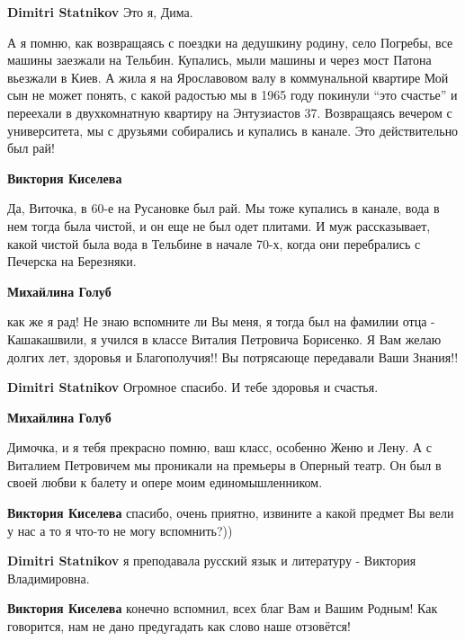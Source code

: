 \begin{itemize}
\begin{itemize}
\textbf{Dimitri Statnikov} Это я, Дима.


А я помню, как возвращаясь с поездки на дедушкину родину, село Погребы, все
машины заезжали на Тельбин. Купались, мыли машины и через мост Патона вьезжали
в Киев. А жила я на Ярославовом валу в коммунальной квартире Мой сын не может
понять, с какой радостью мы в 1965 году покинули \enquote{это счастье} и переехали в
двухкомнатную квартиру на Энтузиастов 37. Возвращаясь вечером с университета,
мы с друзьями собирались и купались в канале. Это действительно был рай!

\begin{itemize} %
\textbf{Виктория Киселева} 

Да, Виточка, в 60-е на Русановке был рай. Мы тоже купались в канале, вода в нем
тогда была чистой, и он еще не был одет плитами. И муж рассказывает, какой
чистой была вода в Тельбине в начале 70-х, когда они перебрались с Печерска на
Березняки.

\end{itemize} %

\textbf{Михайлина Голуб} 

как же я рад! Не знаю вспомните ли Вы меня, я тогда был на фамилии отца -
Кашакашвили, я учился в классе Виталия Петровича Борисенко. Я Вам желаю долгих
лет, здоровья и Благополучия!! Вы потрясающе передавали Ваши Знания!!


\textbf{Dimitri Statnikov} Огромное спасибо. И тебе здоровья и счастья.

\textbf{Михайлина Голуб}

Димочка, и я тебя прекрасно помню, ваш класс, особенно Женю и Лену. А с
Виталием Петровичем мы проникали на премьеры в Оперный театр. Он был в своей
любви к балету и опере моим единомышленником.

\begin{itemize} %
\textbf{Виктория Киселева} спасибо, очень приятно, извините а какой предмет Вы вели у нас а то я что-то не могу вспомнить?))

\textbf{Dimitri Statnikov} я преподавала русский язык и литературу - Виктория Владимировна.

\textbf{Виктория Киселева} конечно вспомнил, всех благ Вам и Вашим Родным! Как говорится, нам не дано предугадать как слово наше отзовётся!
\end{itemize} %


\end{itemize}
\end{itemize}
